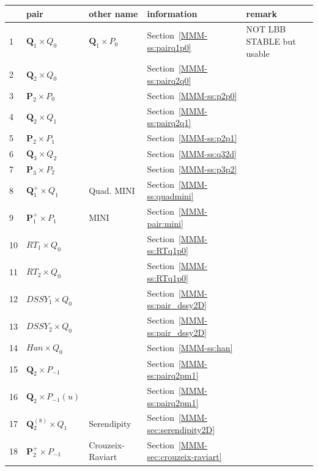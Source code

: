 \begin{center}
\begin{tabular}{p{1cm}p{2.75cm}p{3.5cm}p{2.25cm}p{6cm}}
\hline
 &pair & other name & information & remark \\
\hline
\hline
 1&${\bm Q}_1\times Q_0$       & ${\bm Q}_1\times P_0$       & Section~\ref{MMM-ss:pairq1p0} & NOT LBB STABLE but usable\\
 2&${\bm Q}_2\times Q_0$       &                             & Section~\ref{MMM-ss:pairq2q0}\\
 3&${\bm P}_2\times P_0$       &                             & Section~\ref{MMM-ss:p2p0}\\ 
 4&${\bm Q}_2\times Q_1$       &                             & Section~\ref{MMM-ss:pairq2q1}\\
 5&${\bm P}_2\times P_1$       &                             & Section~\ref{MMM-ss:p2p1}\\
 6&${\bm Q}_3\times Q_2$       &                             & Section~\ref{MMM-ss:q32d}\\
 7&${\bm P}_3\times P_2$       &                             & Section~\ref{MMM-ss:p3p2}\\
 8&${\bm Q}_1^+\times Q_1$     & Quad. MINI                  & Section~\ref{MMM-ss:quadmini}\\
 9&${\bm P}_1^+\times P_1$     & MINI                        & Section~\ref{MMM-pair:mini}\\
10&$RT_1\times Q_0$            &                             & Section~\ref{MMM-ss:RTq1p0}\\
11&$RT_2\times Q_0$            &                             & Section~\ref{MMM-ss:RTq1p0}\\
12&$DSSY_1\times Q_0$          &                             & Section~\ref{MMM-ss:pair_dssy2D}\\
13&$DSSY_2\times Q_0$          &                             & Section~\ref{MMM-ss:pair_dssy2D}\\
14&$Han\times Q_0$             &                             & Section~\ref{MMM-ss:han}\\
15&${\bm Q}_2\times P_{-1}$    &                             & Section~\ref{MMM-ss:pairq2pm1}\\
16&${\bm Q}_2\times P_{-1}(u)$ &                             & Section~\ref{MMM-ss:pairq2pm1}\\
17&${\bm Q}_2^{(8)}\times Q_1$ & Serendipity                 & Section~\ref{MMM-sec:serendipity2D}\\
18&${\bm P}_2^+\times P_{-1}$  & Crouzeix-Raviart            & Section~\ref{MMM-sec:crouzeix-raviart}\\

\end{tabular}
\end{center}

